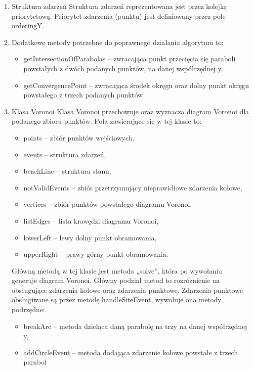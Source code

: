 \documentclass{article}
\begin{document}
\begin{enumerate}
    \item Struktura zdarzeń 
    \newline
    \newline
    Struktura zdarzeń reprezentowana jest przez kolejkę priorytetową. Priorytet zdarzenia (punktu) jest definiowany przez pole orderingY.
    
    \newline
    \newline
    \item Dodatkowe metody potrzebne do poprawnego działania algorytmu to:
    \begin{itemize}
        \item getIntersectionOfParabolas – zwracająca punkt przecięcia się paraboli powstałych z dwóch podanych punktów, na danej współrzędnej y,
        \item getConvergencePoint – zwracająca środek okręgu oraz dolny punkt okręgu powstałego z trzech podanych punktów

    \end{itemize}
    
    \item Klasa Voronoi 
    \newline
    \newline
    Klasa Voronoi przechowuje oraz wyznacza diagram Voronoi dla podanego zbioru punktów.
    \newline
    \newline
    Pola zawierające się w tej klasie to:
    \begin{itemize}
        \item points – zbiór punktów wejściowych,
        \item events – struktura zdarzeń,
        \item beachLine – struktura stanu,
        \item notValidEvents – zbiór przetrzymujący nieprawidłowe zdarzenia kołowe,
        \item vertices – zbiór punktów powstałego diagramu Voronoi,
        \item listEdges – lista krawędzi diagramu Voronoi,
        \item lowerLeft – lewy dolny punkt obramowania,
        \item upperRight – prawy górny punkt obramowania.

    \end{itemize}
    Główną metodą w tej klasie jest metoda „solve”, która po wywołaniu generuje diagram Voronoi.
    \newline
    \newline
    Główny podział metod to rozróżnienie na obsługujące zdarzenia kołowe oraz zdarzenia punktowe.
    Zdarzenia punktowe obsługiwane są przez metodę handleSiteEvent, wywołuje ona metody podrzędne:
    \begin{itemize}
        \item breakArc – metoda dzieląca daną parabolę na trzy na danej współrzędnej y,
        \item addCircleEvent – metoda dodająca zdarzenie kołowe powstałe z trzech parabol
        

\end{itemize}
\end{enumerate}
\end{document}
